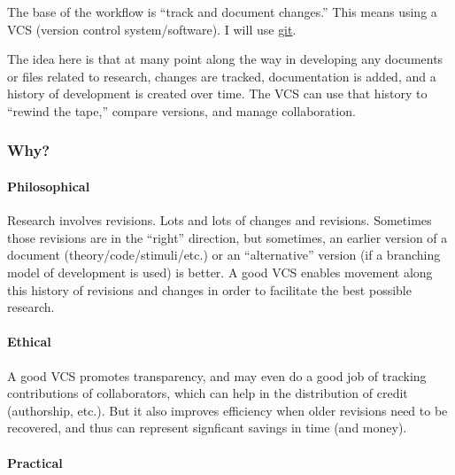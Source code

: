 \documentclass[11pt]{article}
\begin{document}
The base of the workflow is ``track and document changes.''  This means using a VCS (version control system/software).  I will use \href{http:git-scm.com}{git}.

The idea here is that at many point along the way in developing any documents or files related to research, changes are tracked, documentation is added, and a history of development is created over time. The VCS can use that history to ``rewind the tape,'' compare versions, and manage collaboration.
\subsubsection{Why?}
\label{sec-3-2-2}
\paragraph{Philosophical}
\label{sec-3-2-2-1}

Research involves revisions. Lots and lots of changes and revisions. Sometimes those revisions are in the ``right'' direction, but sometimes, an earlier version of a document (theory/code/stimuli/etc.) or an ``alternative'' version (if a branching model of development is used) is better.  A good VCS enables movement along this history of revisions and changes in order to facilitate the best possible research.
\paragraph{Ethical}
\label{sec-3-2-2-2}

A good VCS promotes transparency, and may even do a good job of tracking contributions of collaborators, which can help in the distribution of credit (authorship, etc.). But it also improves efficiency when older revisions need to be recovered, and thus can represent signficant savings in time (and money).
\paragraph{Practical}
\label{sec-3-2-2-3}
\end{document}
